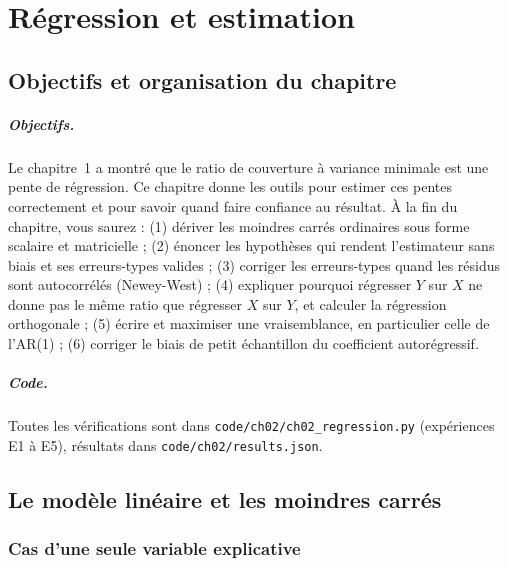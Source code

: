 \chapter{Régression et estimation}
\label{ch:2}

\section{Objectifs et organisation du chapitre}

\paragraph{Objectifs.} Le chapitre~1 a montré que le ratio de couverture à variance minimale est une pente de régression. Ce chapitre donne les outils pour estimer ces pentes correctement et pour savoir quand faire confiance au résultat. À la fin du chapitre, vous saurez : (1) dériver les moindres carrés ordinaires sous forme scalaire et matricielle ; (2) énoncer les hypothèses qui rendent l'estimateur sans biais et ses erreurs-types valides ; (3) corriger les erreurs-types quand les résidus sont autocorrélés (Newey-West) ; (4) expliquer pourquoi régresser $Y$ sur $X$ ne donne pas le même ratio que régresser $X$ sur $Y$, et calculer la régression orthogonale ; (5) écrire et maximiser une vraisemblance, en particulier celle de l'AR(1) ; (6) corriger le biais de petit échantillon du coefficient autorégressif.

\paragraph{Code.} Toutes les vérifications sont dans \texttt{code/ch02/ch02\_regression.py} (expériences E1 à E5), résultats dans \texttt{code/ch02/results.json}.

\section{Le modèle linéaire et les moindres carrés}

\subsection{Cas d'une seule variable explicative}

